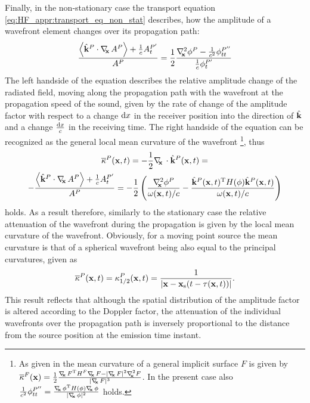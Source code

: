 Finally, in the non-stationary case the transport equation \eqref{eq:HF_appr:transport_eq_non_stat} describes, how the amplitude of a wavefront element changes over its propagation path:
\begin{equation}
\frac{ \left< \hat{\mathbf{k}}^P \cdot \nabla_{\!\!\mathbf{x}}\, A^P \right>+\frac{1}{c} A^{P'}_t }{A^P}  = \frac{1}{2} \frac{ \nabla^2_{\!\!\mathbf{x}} \phi^P - \frac{1}{c^2} \phi^{P''}_{tt} }{\frac{1}{c}\phi^{P'}_t}
\end{equation}
The left handside of the equation describes the relative amplitude change of the radiated field, moving along the propagation path with the wavefront at the propagation speed of the sound, given by the rate of change of the amplitude factor with respect to a change $\mathrm{d} x$ in the receiver position into the direction of $\hat{\mathbf{k}}$ and a change $\frac{\mathrm{d} x}{c}$ in the receiving time.
The right handside of the equation can be recognized as the general local mean curvature of the wavefront \cite[4.2]{Goldman2005}\footnote{As given in \cite{Goldman2005} the mean curvature of a general implicit surface $F$ is given by 
$\overline{\kappa}^F(\vx) = \frac{1}{2}\frac{\Dx F^{\mathrm{T}} H^F \Dx F - |\Dx F|^2 \Lx F }{|\Dx F|^3}$. In the present case also $\frac{1}{c^2} \phi^{P''}_{tt} = \frac{\nabla_{\!\!\mathbf{x}}\, \phi^{\mathrm{T}} H(\phi) \nabla_{\!\!\mathbf{x}}\, \phi}{|\nabla_{\!\!\mathbf{x}}\, \phi|^2}$ holds.}, thus
\begin{multline}
\overline{\kappa}^P(\mathbf{x},t) = -\frac{1}{2}\nabla_{\!\!\mathbf{x}}\, \cdot \hat{\mathbf{k}}^P(\mathbf{x},t)= \\
-\frac{ \left< \hat{\mathbf{k}}^P \cdot \nabla_{\!\!\mathbf{x}}\, A^P \right>+\frac{1}{c} A^{P'}_t }{A^P} = -\frac{1}{2} \left( \frac{ \nabla^2_{\!\!\mathbf{x}} \phi^P  }{ \omega(\mathbf{x},t)/c } - \frac{ \hat{\mathbf{k}}^P(\mathbf{x},t)^{\mathrm{T}} H(\phi) \hat{\mathbf{k}}^P(\mathbf{x},t) }{ \omega(\mathbf{x},t)/c } \right)
\label{Eq:Moving_source:attenuation}
\end{multline}
holds.
As a result therefore, similarly to the stationary case the relative attenuation of the wavefront during the propagation is given by the local mean curvature of the wavefront.
Obviously, for a moving point source the mean curvature is that of a spherical wavefront being also equal to the principal curvatures, given as
\begin{equation}
\overline{\kappa}^P(\mathbf{x},t) = \kappa^P_{1/2}(\mathbf{x},t) = \frac{1}{|\mathbf{x}-\mathbf{x}_{\mathrm{s}}(t-\tau(\mathbf{x},t))|}.
\label{Eq:Moving_source:attenuation_2}
\end{equation}
This result reflects that although the spatial distribution of the amplitude factor is altered according to the Doppler factor, the attenuation of the individual wavefronts over the propagation path is inversely proportional to the distance from the source position at the emission time instant.

